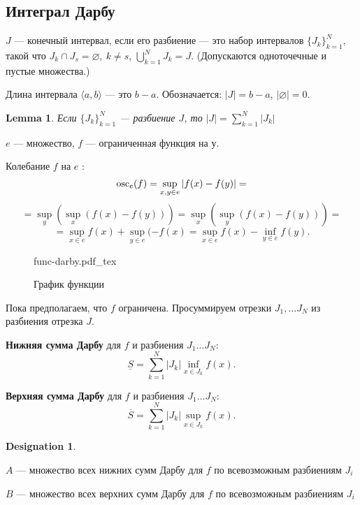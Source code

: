\documentclass[11pt]{book}
\newcommand{\incfig}[1]{%
    \def\svgwidth{\columnwidth}
    {#1.pdf_tex}
}
\newcommand{\slim}{\sum\limits}
\newcommand{\osc}{{\mathop{\text{\rm osc}}}}
\theoremstyle{definition}
\theoremstyle{plain}
\theoremstyle{plain}
\newtheorem*{lm}{Lemma}
\theoremstyle{definition}
\newtheorem*{name}{Designation}
\theoremstyle{remark}
\begin{document}
\subsection{Интеграл Дарбу}
\begin{defn}
    $ J$ --- конечный интервал, если его разбиение --- это набор  интервалов $ \{J_k\}^{N}_{k=1}$, такой что $ J_k \cap  J_s = \varnothing, ~k \ne s $,
    $ \bigcup_{k=1}^{{N}} J_k = J $. (Допускаются одноточечные и пустые множества.)
\end{defn}
\begin{defn}
    Длина интервала $ \langle a, b \rangle$ --- это $ b - a$.
    Обозначается: $ |J| = b-a$, $ |\varnothing| = 0$.
\end{defn}
\begin{lm}
    Если $ \{J_k\}_{k= 1}^{N}$ --- разбиение $ J$, то $|J| = \slim_{k=1}^{N}  |J_k|$
\end{lm}
\begin{defn}
    $ e$ --- множество, $ f$ --- ограниченная функция на $ у$.

    Колебание $ f$ на $  e$ :
    \[
	\osc_e (f) = \sup_{x, y \in  e} |f(x) - f(y)|=
    \]
    \[
	=	\sup_{y} \left( \sup_x (f(x) - f(y)) \right)  = \sup_x \left( \sup_y (f(x) - f(y))  \right) =
    \]
    \[
	=\sup_{x \in  e}  f(x)  + \sup_{y \in  e}(-f(x) = \sup _{x \in  e} f(x) - \inf_{y \in  e} f(y)
    .\]
\end{defn}
\begin{figure}[ht]
    \centering
    \incfig{func-darby}
    \caption{График функции}
    \label{fig:func-darby}
\end{figure}
Пока предполагаем, что $ f$ ограничена.
Просуммируем отрезки $ J_1, \ldots J_N $ из разбиения отрезка $ J$.
\begin{description}
    \item {\bf  Нижняя сумма Дарбу}  для $ f$ и разбиения $ J_1 \ldots  J_N$:
\[
	\underline{S} = \slim_{k= 1}^{N} |J_k|\inf_{x \in  J_k} f(x) 
.\]
\item {\bf Верхняя сумма Дарбу}  для $ f$ и разбиения $ J_1 \ldots  J_N$:
\[
   \overline{S} =\slim_{k= 1}^{N} |J_k|\sup_{x \in  J_k} f(x) 
.\] 
\end{description}
\begin{name}
    $ $

    $ A$ --- множество всех нижних сумм Дарбу для $ f$ по всевозможным разбиениям $ J_i$

    $ B$ --- множество всех верхних сумм Дарбу для $ f$ по всевозможным разбиениям $ J_i$
\end{name}
\end{document}
